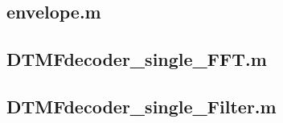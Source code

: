 \documentclass[journal]{./sty/IEEEtran}
\begin{document}
\subsection{envelope.m}

\subsection{DTMFdecoder\_single\_FFT.m}

\subsection{DTMFdecoder\_single\_Filter.m}


%
%


\ifCLASSOPTIONcaptionsoff
  \newpage
\fi




\end{document}
